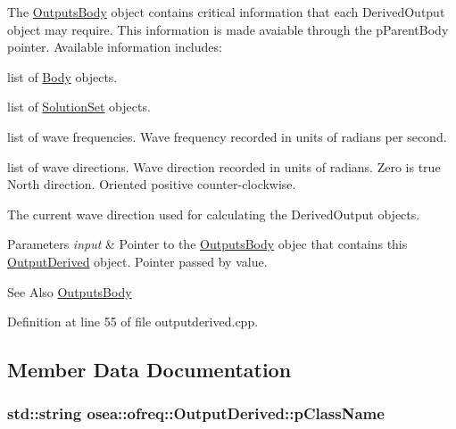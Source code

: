 The \hyperlink{classosea_1_1ofreq_1_1_outputs_body}{Outputs\-Body} object contains critical information that each Derived\-Output object may require. This information is made avaiable through the p\-Parent\-Body pointer. Available information includes\-:
\begin{DoxyItemize}
\item list of \hyperlink{classosea_1_1ofreq_1_1_body}{Body} objects.
\item list of \hyperlink{classosea_1_1ofreq_1_1_solution_set}{Solution\-Set} objects.
\item list of wave frequencies. Wave frequency recorded in units of radians per second.
\item list of wave directions. Wave direction recorded in units of radians. Zero is true North direction. Oriented positive counter-\/clockwise.
\item The current wave direction used for calculating the Derived\-Output objects. 
\begin{DoxyParams}{Parameters}
{\em input} & Pointer to the \hyperlink{classosea_1_1ofreq_1_1_outputs_body}{Outputs\-Body} objec that contains this \hyperlink{classosea_1_1ofreq_1_1_output_derived}{Output\-Derived} object. Pointer passed by value.\\
\hline
\end{DoxyParams}
\begin{DoxySeeAlso}{See Also}
\hyperlink{classosea_1_1ofreq_1_1_outputs_body}{Outputs\-Body} 
\end{DoxySeeAlso}

\end{DoxyItemize}

Definition at line 55 of file outputderived.\-cpp.



\subsection{Member Data Documentation}
\hypertarget{classosea_1_1ofreq_1_1_output_derived_a50a1b7eb160d2e9c7a89b151df1dd008}{
\subsubsection[{p\-Class\-Name}]{\setlength{\rightskip}{0pt plus 5cm}std\-::string osea\-::ofreq\-::\-Output\-Derived\-::p\-Class\-Name\hspace{0.3cm}{\ttfamily [protected]}}}\label{classosea_1_1ofreq_1_1_output_derived_a50a1b7eb160d2e9c7a89b151df1dd008}


